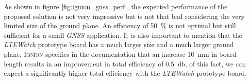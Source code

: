 \documentclass[report.tex]{subfiles}
\begin{document}
As shown in figure \ref{fig:ignion_gnss_perf}, the expected performance of the proposed solution is not very impressive but is not that bad considering the very limited size of the ground plane. An efficiency of \SI{50}{\percent} is not optimal but still sufficient for a small \textit{GNSS} application. It is also important to mention that the \textit{LTEWatch} prototype board has a much larger size and a much larger ground plane. \textsc{Ignion} specifies in the documentation that an increase \SI{10}{\milli\meter} in board length results in an improvement in total efficiency of \SI{0.5}{\decibel}, of this fact, we can expect a significantly higher total efficiency with the \textit{LTEWatch} prototype board.
\end{document}
